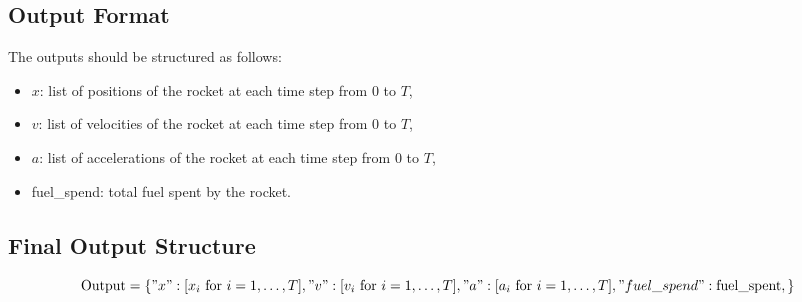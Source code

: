 \documentclass{article}
\begin{document}
\subsection*{Output Format}
The outputs should be structured as follows:
\begin{itemize}
    \item $x$: list of positions of the rocket at each time step from 0 to $T$,
    \item $v$: list of velocities of the rocket at each time step from 0 to $T$,
    \item $a$: list of accelerations of the rocket at each time step from 0 to $T$,
    \item fuel\_spend: total fuel spent by the rocket.
\end{itemize}

\subsection*{Final Output Structure}
\[
\text{Output} = \{
    "x": [x_i \text{ for } i = 1, \ldots, T],
    "v": [v_i \text{ for } i = 1, \ldots, T],
    "a": [a_i \text{ for } i = 1, \ldots, T],
    "fuel\_spend": \text{fuel\_spent},
\}
\]
\end{document}
